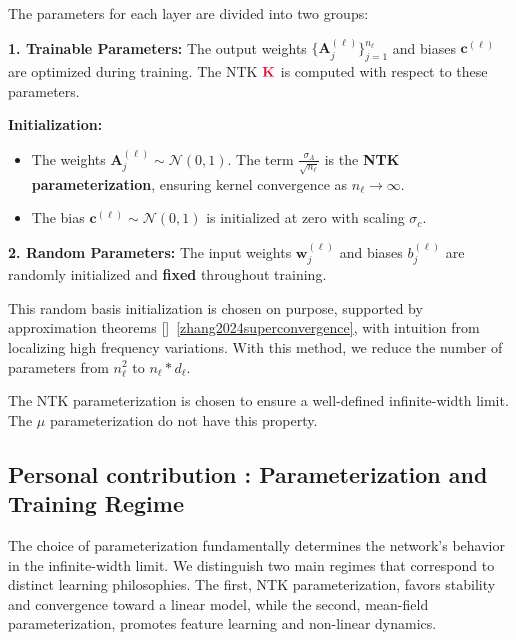 \documentclass[a4paper]{article}
\newcommand{\Kop}{\textcolor{kernelcolor}{\mathbf{K}}}
\theoremstyle{plain}
\theoremstyle{definition}
\theoremstyle{remark}
\newcommand{\Kop}{\textcolor{kernelcolor}{\mathbf{K}}}
\begin{document}
\begin{tcolorbox}[colback=blue!15,colframe=blue!80!black,title={\textbf{Remark : Parameter Classification}},enhanced,drop shadow,boxrule=2pt]
The parameters for each layer are divided into two groups:

\textbf{1. Trainable Parameters:} The output weights $\{\bm{A}_j^{(\ell)}\}_{j=1}^{n_\ell}$ and biases $\bm{c}^{(\ell)}$ are optimized during training. The NTK $\Kop $ is computed with respect to these parameters.

\textbf{Initialization:}
\begin{itemize}
\item The weights $\bm{A}_j^{(\ell)} \sim \mathcal{N}(0, 1)$. The term $\frac{\sigma_A}{\sqrt{n_\ell}}$ is the \textbf{NTK parameterization}, ensuring kernel convergence as $n_\ell \to \infty$.
\item The bias $\bm{c}^{(\ell)} \sim \mathcal{N}(0, 1)$ is initialized at zero with scaling $\sigma_c$.
\end{itemize}

\textbf{2. Random Parameters:} The input weights $\bm{w}_j^{(\ell)}$ and biases $b_j^{(\ell)}$ are randomly initialized and \textbf{fixed} throughout training.
\end{tcolorbox}



\begin{tcolorbox}[colback=green!5,colframe=green!80!black,title={\textbf{Insight : Architectural Philosophy}},enhanced,drop shadow,boxrule=2pt]
This random basis initialization is chosen on purpose, supported by approximation theorems []~\ref{zhang2024superconvergence}, with intuition from localizing high frequency variations.
With this method, we reduce the number of parameters from $n_\ell^2$ to $n_\ell * d_\ell$.

The NTK parameterization is chosen to ensure a well-defined infinite-width limit. The $\mu$ parameterization do not have this property.
\end{tcolorbox}



\subsection{Personal contribution : Parameterization and Training Regime}

The choice of parameterization fundamentally determines the network's behavior in the infinite-width limit. We distinguish two main regimes that correspond to distinct learning philosophies. The first, NTK parameterization, favors stability and convergence toward a linear model, while the second, mean-field parameterization, promotes feature learning and non-linear dynamics.
\end{document}
